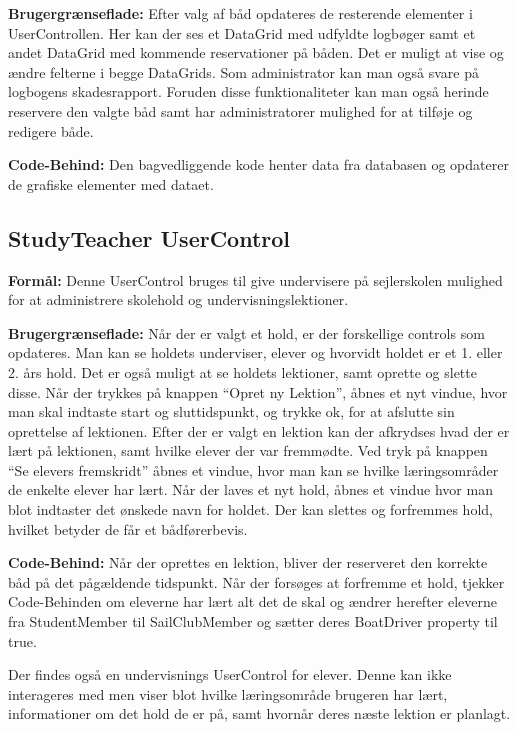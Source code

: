 \textbf{Brugergrænseflade:}
Efter valg af båd opdateres de resterende elementer i UserControllen. 
Her kan der ses et DataGrid med udfyldte logbøger samt et andet DataGrid med kommende reservationer på båden.
Det er muligt at vise og ændre felterne i begge DataGrids.
Som administrator kan man også svare på logbogens skadesrapport.
Foruden disse funktionaliteter kan man også herinde reservere den valgte båd samt har administratorer mulighed for at tilføje og redigere både.

\textbf{Code-Behind:}
Den bagvedliggende kode henter data fra databasen og opdaterer de grafiske elementer med dataet.

\subsection{StudyTeacher UserControl}

\textbf{Formål:}
Denne UserControl bruges til give undervisere på sejlerskolen mulighed for at administrere skolehold og undervisningslektioner.

\textbf{Brugergrænseflade:}
Når der er valgt et hold, er der forskellige controls som opdateres.
Man kan se holdets underviser, elever og hvorvidt holdet er et 1. eller 2. års hold. 
Det er også muligt at se holdets lektioner, samt oprette og slette disse.
Når der trykkes på knappen ``Opret ny Lektion'', åbnes et nyt vindue, hvor man skal indtaste start og sluttidspunkt, og trykke ok, for at afslutte sin oprettelse af lektionen.
Efter der er valgt en lektion kan der afkrydses hvad der er lært på lektionen, samt hvilke elever der var fremmødte.
Ved tryk på knappen ``Se elevers fremskridt'' åbnes et vindue, hvor man kan se hvilke læringsområder de enkelte elever har lært.
Når der laves et nyt hold, åbnes et vindue hvor man blot indtaster det ønskede navn for holdet.
Der kan slettes og forfremmes hold, hvilket betyder de får et bådførerbevis.

\textbf{Code-Behind:}
Når der oprettes en lektion, bliver der reserveret den korrekte båd på det pågældende tidspunkt.
Når der forsøges at forfremme et hold, tjekker Code-Behinden om eleverne har lært alt det de skal og ændrer herefter eleverne fra StudentMember til SailClubMember og sætter deres BoatDriver property til true.

Der findes også en undervisnings UserControl for elever. 
Denne kan ikke interageres med men viser blot hvilke læringsområde brugeren har lært, informationer om det hold de er på, samt hvornår deres næste lektion er planlagt.

